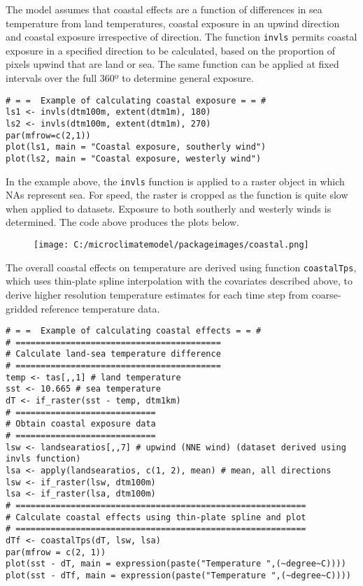 \documentclass[]{article}
\begin{document}
The model assumes that coastal effects are a function of differences in
sea temperature from land temperatures, coastal exposure in an upwind
direction and coastal exposure irrespective of direction. The function
\texttt{invls} permits coastal exposure in a specified direction to be
calculated, based on the proportion of pixels upwind that are land or
sea. The same function can be applied at fixed intervals over the full
360º to determine general exposure.

\begin{verbatim}
# = =  Example of calculating coastal exposure = = #
ls1 <- invls(dtm100m, extent(dtm1m), 180)
ls2 <- invls(dtm100m, extent(dtm1m), 270)
par(mfrow=c(2,1))
plot(ls1, main = "Coastal exposure, southerly wind")
plot(ls2, main = "Coastal exposure, westerly wind")
\end{verbatim}

In the example above, the \texttt{invls} function is applied to a raster
object in which NAs represent sea. For speed, the raster is cropped as
the function is quite slow when applied to datasets. Exposure to both
southerly and westerly winds is determined. The code above produces the
plots below.

\begin{figure}
\centering
\texttt{[image: C:/microclimatemodel/packageimages/coastal.png]}
\caption{}
\end{figure}

The overall coastal effects on temperature are derived using function
\texttt{coastalTps}, which uses thin-plate spline interpolation with the
covariates described above, to derive higher resolution temperature
estimates for each time step from coarse-gridded reference temperature
data.

\begin{verbatim}
# = =  Example of calculating coastal effects = = #
# =========================================
# Calculate land-sea temperature difference
# =========================================
temp <- tas[,,1] # land temperature
sst <- 10.665 # sea temperature
dT <- if_raster(sst - temp, dtm1km)
# ============================
# Obtain coastal exposure data
# ============================
lsw <- landsearatios[,,7] # upwind (NNE wind) (dataset derived using invls function)
lsa <- apply(landsearatios, c(1, 2), mean) # mean, all directions
lsw <- if_raster(lsw, dtm100m)
lsa <- if_raster(lsa, dtm100m)
# ==========================================================
# Calculate coastal effects using thin-plate spline and plot
# ==========================================================
dTf <- coastalTps(dT, lsw, lsa)
par(mfrow = c(2, 1))
plot(sst - dT, main = expression(paste("Temperature ",(~degree~C))))
plot(sst - dTf, main = expression(paste("Temperature ",(~degree~C))))
\end{verbatim}
\end{document}
